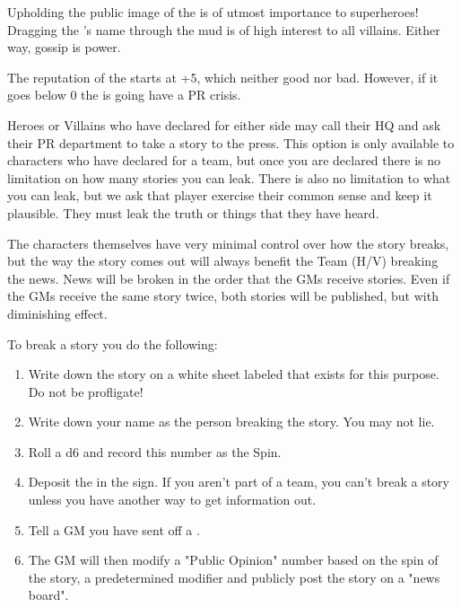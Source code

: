 \documentclass[green]{LRSguildcamp1}
\begin{document}
\name{\gPR{}}

Upholding the public image of the \cHeroLeague{\intro} is of utmost importance to superheroes! 
Dragging the \cHeroLeague{}'s name through the mud is of high interest to all villains. Either way, gossip is power. 

The reputation of the \cHeroLeague{\intro} starts at +5, which neither good nor bad. However, if it goes below 0 the \cHeroLeague{} is going have a PR crisis. 

Heroes or Villains who have declared for either side may call their HQ and ask their PR department to take a story to the press. This option is only available to characters who have declared for a team, but once you are declared there is no limitation on how many stories you can leak. There is also no limitation to what you can leak, but we ask that player exercise their common sense and keep it plausible. They must leak the truth or things that they have heard. 

The characters themselves have very minimal control over how the story breaks, but the way the story comes out will always benefit the Team (H/V) breaking the news. News will be broken in the order that the GMs receive stories. Even if the GMs receive the same story twice, both stories will be published, but with diminishing effect. 

To break a story you do the following:
\begin{enumerate}

\item Write down the story on a white sheet labeled \wPressRelease{} that exists for this purpose. Do not be profligate! 

\item Write down your name as the person breaking the story. You may not lie. 

\item Roll a d6 and record this number as the Spin. 

\item Deposit the \wPressRelease{} in the \sEmails{} sign. If you aren't part of a team, you can't break a story unless you have another way to get information out. 

\item Tell a GM you have sent off a \wPressRelease{}.

\item The GM will then modify a "Public Opinion" number based on the spin of the story, a predetermined modifier and publicly post the story on a "news board".
\end{enumerate}
\end{document}

